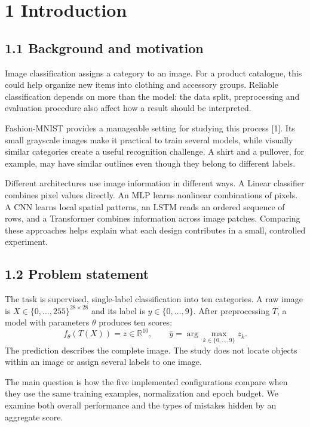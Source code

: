 \section{1 Introduction}
\label{sec:introduction}
\subsection{1.1 Background and motivation}
Image classification assigns a category to an image. For a product catalogue,
this could help organize new items into clothing and accessory groups.
Reliable classification depends on more than the model: the data split,
preprocessing and evaluation procedure also affect how a result should be
interpreted.

Fashion-MNIST provides a manageable setting for studying this process
[1]. Its small grayscale images make it practical to train
several models, while visually similar categories create a useful recognition
challenge. A shirt and a pullover, for example, may have similar outlines even
though they belong to different labels.

Different architectures use image information in different ways. A Linear
classifier combines pixel values directly. An MLP learns nonlinear combinations
of pixels. A CNN learns local spatial patterns, an LSTM reads an ordered sequence
of rows, and a Transformer combines information across image patches.
Comparing these approaches helps explain what each design contributes in a
small, controlled experiment.

\subsection{1.2 Problem statement}
The task is supervised, single-label classification into ten categories.
A raw image is $X\in\{0,\ldots,255\}^{28\times28}$ and its label is
$y\in\{0,\ldots,9\}$. After preprocessing $T$, a model with parameters $\theta$
produces ten scores:
\[
f_\theta(T(X))=z\in\mathbb{R}^{10},
\qquad \hat y=\arg\max_{k\in\{0,\ldots,9\}}z_k.
\]
The prediction describes the complete image. The study does not locate objects
within an image or assign several labels to one image.

The main question is how the five implemented configurations compare when they
use the same training examples, normalization and epoch budget. We examine both
overall performance and the types of mistakes hidden by an aggregate score.

